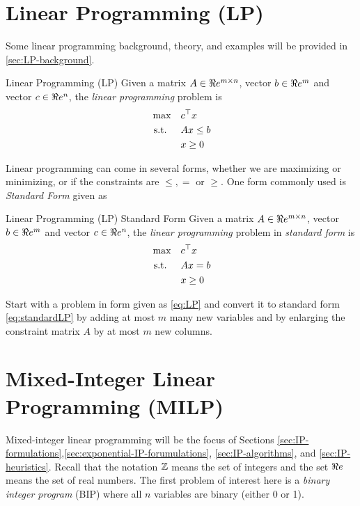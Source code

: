 \section{Linear Programming (LP)}
Some linear programming background, theory, and examples will be provided in \autoref{sec:LP-background}.
\begin{general}{Linear Programming (LP)}{\polynomial}
Given a matrix $A \in \Re e^{m\times n}$, vector $b \in \Re e^m$ and vector $c \in \Re e^n$, the \emph{linear programming} problem is
\begin{equation}
\label{eq:LP}
\begin{split}
\max \quad & c^\top x\\
\mbox{ s.t. }  \quad & Ax \leq b\\
& x \geq 0
\end{split}
\end{equation}
\end{general}

Linear programming can come in several forms, whether we are maximizing or minimizing, or if the constraints are $\leq, =$ or $\geq$.   One form commonly used is \emph{Standard Form} given as 
\begin{general}{Linear Programming (LP) Standard Form}{\polynomial}
Given a matrix $A \in \Re e^{m\times n}$, vector $b \in \Re e^m$ and vector $c \in \Re e^n$, the \emph{linear programming} problem in \emph{standard form} is
\begin{equation}
\label{eq:standardLP}
\begin{split}
\max \quad & c^\top x\\
\mbox{ s.t. }  \quad & Ax = b\\
& x \geq 0
\end{split}
\end{equation}
\end{general}



\begin{exercise}
\label{exercise:LPconversion}
Start with a problem in form given as \eqref{eq:LP} and convert it to standard form \eqref{eq:standardLP} by adding at most $m$ many new variables and by enlarging the constraint matrix $A$ by at most $m$ new columns.
\end{exercise}
\section{Mixed-Integer Linear Programming (MILP)}
Mixed-integer linear programming will be the focus of Sections \ref{sec:IP-formulations},\ref{sec:exponential-IP-forumulations}, \ref{sec:IP-algorithms}, and \ref{sec:IP-heuristics}.
Recall that the notation ${\mathbb{Z}}$ means the set of integers and the set $\Re e$ means the set of real numbers.  The first problem of interest here is a \emph{binary integer program} (BIP) where all $n$ variables are binary (either 0 or 1).

